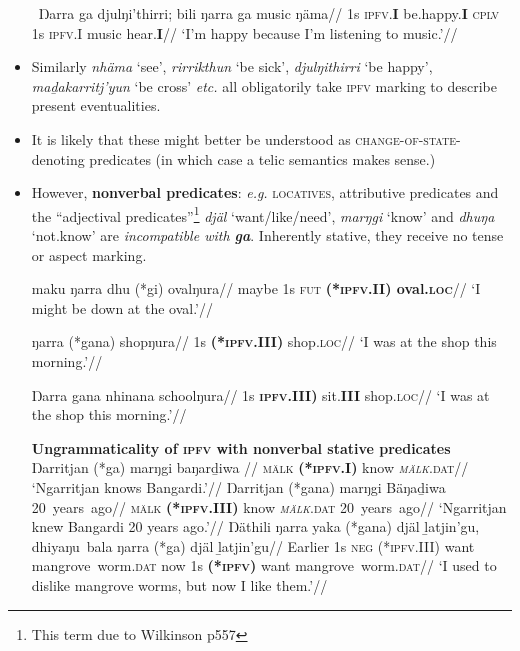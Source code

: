 \documentclass[11pt]{article}
\begin{document}
\begin{itemize}
\a\begingl\gla Ŋarra ga djulŋi'thirri; bili ŋarra ga music ŋäma//
\glb 1s \textsc{ipfv.\textbf{I}} be.happy.\textbf{I} \textsc{cplv} 1s \textsc{ipfv.I} music hear.\textbf{I}//
\glft`I'm happy because I'm listening to music.'\trailingcitation{[DG20190517]}//
\endgl
\xe

\item Similarly \textit{nhäma} `see', \textit{rirrikthun} `be sick', \textit{djulŋithirri} `be happy', \textit{maḏakarritj'yun} `be cross' \textit{etc.} all obligatorily take \textsc{ipfv} marking to describe present eventualities.
\item It is likely that these might better be understood as \textsc{change-of-state}-denoting predicates (in which case a telic semantics makes sense.)

\item However, \textbf{nonverbal predicates}: \textit{e.g.} \textsc{locatives}, attributive predicates and the ``adjectival predicates''\footnote{This term due to Wilkinson p557} \textit{djäl} `want/like/need', \textit{marŋgi} `know' and \textit{dhuŋa} `not.know' are \textit{incompatible with \textbf{ga}}. Inherently stative, they receive no tense or aspect marking.

\pex
\a\begingl\gla maku ŋarra dhu (*gi) ovalŋura//
\glb maybe 1s \textsc{fut} \textbf{(*\textsc{ipfv.II}) oval.\textsc{loc}}//
\glft`I might be down at the oval.'\trailingcitation{[DG20190417]}//\endgl

\a\begingl\gla ŋarra (*gana) shopŋura//
\glb 1s \textbf{(*\textsc{ipfv.III})} shop.\textsc{loc}//
\glft`I was at the shop this morning.'\trailingcitation{[DG20190417]}//\endgl

\a\begingl\gla Ŋarra gana nhinana schoolŋura//
\glb 1s \textbf{\textsc{ipfv.III})} sit.\textbf{III} shop.\textsc{loc}//
\glft`I was at the shop this morning.'\trailingcitation{[DG20190417]}//\endgl
\xe

\pex\textbf{Ungrammaticality of \textsc{ipfv} with nonverbal stative predicates}
\a\begingl\gla Ŋarritjan (*ga) marŋgi baŋarḏiwa //
\glb \textsc{mälk} \textbf{(*\textsc{ipfv}.I)} know \textsc{\textit{mälk}}.\textsc{dat}//
\glft `Ngarritjan knows Bangardi.'\trailingcitation{[BM20190416]}//\endgl
\a\begingl\gla Ŋarritjan (*gana) marŋgi Bäŋaḏiwa 20~years~ago//
\glb \textsc{mälk} \textbf{(*\textsc{ipfv}.III)} know \textsc{\textit{mälk}}.\textsc{dat} 20~years~ago//
\glft `Ngarritjan knew Bangardi 20 years ago.'\trailingcitation{[DG20190417]}//\endgl
\a\begingl\gla Ŋäthili ŋarra yaka (*gana) djäl ḻatjin'gu,  dhiyaŋu~bala ŋarra (*ga) djäl ḻatjin'gu//
\glb Earlier 1s \textsc{neg} \textsc{(*ipfv.III)} want mangrove~worm.\textsc{dat} now 1s \textbf{(*\textsc{ipfv})} want mangrove~worm.\textsc{dat}//
\glft`I used to dislike mangrove worms, but now I like them.'\trailingcitation{[DG20191417]}//\endgl
\xe
\end{itemize}
\end{document}
